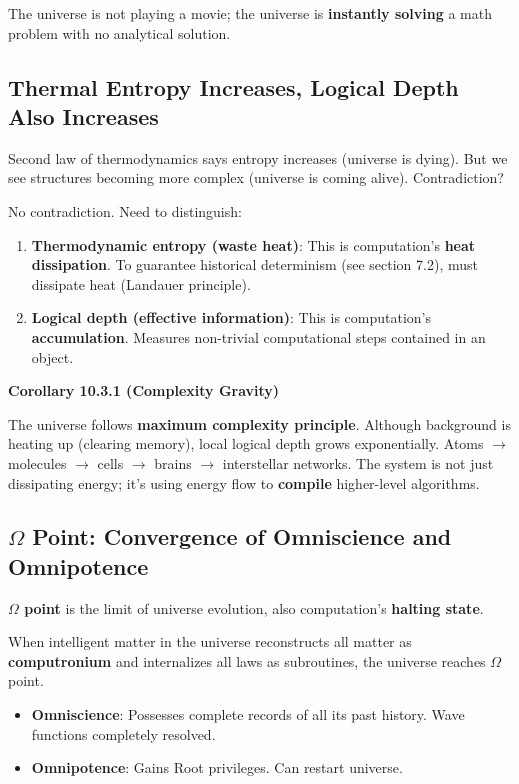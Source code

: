The universe is not playing a movie; the universe is \textbf{instantly solving} a math problem with no analytical solution.

\subsection{Thermal Entropy Increases, Logical Depth Also Increases}

Second law of thermodynamics says entropy increases (universe is dying).
But we see structures becoming more complex (universe is coming alive). Contradiction?

No contradiction. Need to distinguish:
\begin{enumerate}
\item \textbf{Thermodynamic entropy (waste heat)}: This is computation's \textbf{heat dissipation}. To guarantee historical determinism (see section 7.2), must dissipate heat (Landauer principle).
\item \textbf{Logical depth (effective information)}: This is computation's \textbf{accumulation}. Measures non-trivial computational steps contained in an object.
\end{enumerate}

\textbf{Corollary 10.3.1 (Complexity Gravity)}

The universe follows \textbf{maximum complexity principle}.
Although background is heating up (clearing memory), local logical depth grows exponentially.
Atoms $\to$ molecules $\to$ cells $\to$ brains $\to$ interstellar networks.
The system is not just dissipating energy; it's using energy flow to \textbf{compile} higher-level algorithms.

\subsection{$\Omega$ Point: Convergence of Omniscience and Omnipotence}

\textbf{$\Omega$ point} is the limit of universe evolution, also computation's \textbf{halting state}.

When intelligent matter in the universe reconstructs all matter as \textbf{computronium} and internalizes all laws as subroutines, the universe reaches $\Omega$ point.

\begin{itemize}
\item \textbf{Omniscience}: Possesses complete records of all its past history. Wave functions completely resolved.
\item \textbf{Omnipotence}: Gains Root privileges. Can restart universe.
\end{itemize}

